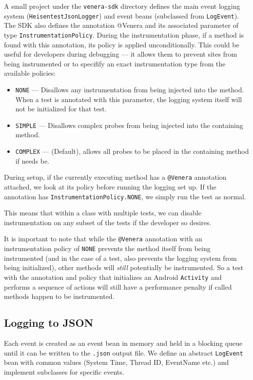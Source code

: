 A small project under the {\tt venera-sdk} directory defines the main event
logging system ({\tt HeisentestJsonLogger}) and event beans (subclassed from
{\tt LogEvent}). The \venera SDK also defines the annotation @Venera and its
associated parameter of type {\tt InstrumentationPolicy}. During the
instrumentation phase, if a method is found with this annotation, its policy
is applied unconditionally. This could be useful for developers during
debugging --- it allows them to prevent sites from being instrumented or to
specifify an exact instrumentation type from the available policies:
\begin{itemize}
  \item {\tt NONE} --- Disallows any instrumentation from being injected into
  the method. When a test is annotated with this parameter, the logging system
  itself will not be initialized for that test.
  \item {\tt SIMPLE} --- Disallows complex probes from being injected into the
  containing method.
  \item {\tt COMPLEX} --- (Default), allows all probes to be placed
  in the containing method if needs be.
\end{itemize}

During setup, if the currently executing method has a {\tt @Venera} annotation
attached, we look at its policy before running the logging set up. If the
annotation has {\tt InstrumentationPolicy.NONE}, we simply run the test as normal.

This means that within a class with multiple tests, we can disable
instrumentation on any subset of the tests if the developer so desires.

It is important to note that while the {\tt @Venera} annotation with an
instrumentation policy of {\tt NONE} prevents the method itself from being
instrumented (and in the case of a test, also prevents the logging system from
being initialized), other methods will \textit{still} potentially be
instrumented. So a test with the annotation and policy that initializes an
Android {\tt Activity} and performs a sequence of actions will still have a
performance penalty if called methods happen to be instrumented.

\subsection{Logging to JSON}

Each event is created as an event bean in memory and held in a blocking queue
until it can be written to the {\tt .json} output file. We define an abstract
{\tt LogEvent} bean with common values (System Time, Thread ID, EventName etc.)
and implement subclasses for specific events.

